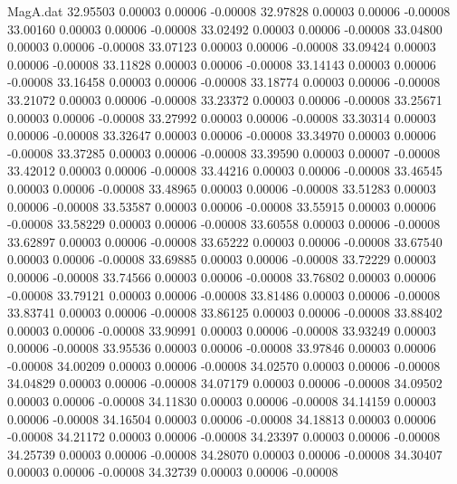 \begin{filecontents}{MagA.dat}
  32.95503    0.00003    0.00006   -0.00008
  32.97828    0.00003    0.00006   -0.00008
  33.00160    0.00003    0.00006   -0.00008
  33.02492    0.00003    0.00006   -0.00008
  33.04800    0.00003    0.00006   -0.00008
  33.07123    0.00003    0.00006   -0.00008
  33.09424    0.00003    0.00006   -0.00008
  33.11828    0.00003    0.00006   -0.00008
  33.14143    0.00003    0.00006   -0.00008
  33.16458    0.00003    0.00006   -0.00008
  33.18774    0.00003    0.00006   -0.00008
  33.21072    0.00003    0.00006   -0.00008
  33.23372    0.00003    0.00006   -0.00008
  33.25671    0.00003    0.00006   -0.00008
  33.27992    0.00003    0.00006   -0.00008
  33.30314    0.00003    0.00006   -0.00008
  33.32647    0.00003    0.00006   -0.00008
  33.34970    0.00003    0.00006   -0.00008
  33.37285    0.00003    0.00006   -0.00008
  33.39590    0.00003    0.00007   -0.00008
  33.42012    0.00003    0.00006   -0.00008
  33.44216    0.00003    0.00006   -0.00008
  33.46545    0.00003    0.00006   -0.00008
  33.48965    0.00003    0.00006   -0.00008
  33.51283    0.00003    0.00006   -0.00008
  33.53587    0.00003    0.00006   -0.00008
  33.55915    0.00003    0.00006   -0.00008
  33.58229    0.00003    0.00006   -0.00008
  33.60558    0.00003    0.00006   -0.00008
  33.62897    0.00003    0.00006   -0.00008
  33.65222    0.00003    0.00006   -0.00008
  33.67540    0.00003    0.00006   -0.00008
  33.69885    0.00003    0.00006   -0.00008
  33.72229    0.00003    0.00006   -0.00008
  33.74566    0.00003    0.00006   -0.00008
  33.76802    0.00003    0.00006   -0.00008
  33.79121    0.00003    0.00006   -0.00008
  33.81486    0.00003    0.00006   -0.00008
  33.83741    0.00003    0.00006   -0.00008
  33.86125    0.00003    0.00006   -0.00008
  33.88402    0.00003    0.00006   -0.00008
  33.90991    0.00003    0.00006   -0.00008
  33.93249    0.00003    0.00006   -0.00008
  33.95536    0.00003    0.00006   -0.00008
  33.97846    0.00003    0.00006   -0.00008
  34.00209    0.00003    0.00006   -0.00008
  34.02570    0.00003    0.00006   -0.00008
  34.04829    0.00003    0.00006   -0.00008
  34.07179    0.00003    0.00006   -0.00008
  34.09502    0.00003    0.00006   -0.00008
  34.11830    0.00003    0.00006   -0.00008
  34.14159    0.00003    0.00006   -0.00008
  34.16504    0.00003    0.00006   -0.00008
  34.18813    0.00003    0.00006   -0.00008
  34.21172    0.00003    0.00006   -0.00008
  34.23397    0.00003    0.00006   -0.00008
  34.25739    0.00003    0.00006   -0.00008
  34.28070    0.00003    0.00006   -0.00008
  34.30407    0.00003    0.00006   -0.00008
  34.32739    0.00003    0.00006   -0.00008

\end{filecontents}
